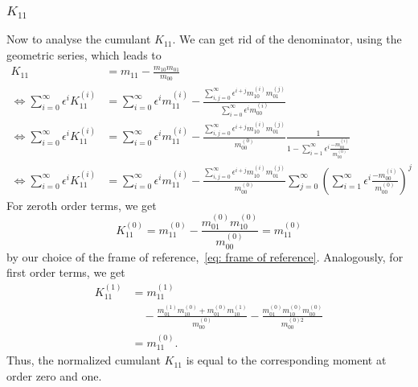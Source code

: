 \subsubsection{\texorpdfstring{$K_{11}$}{K 11}}
\label{subs:K_11}

Now to analyse the cumulant $K_{11}$. We can get rid of the denominator, using the geometric series, which leads to
\begin{equation}
  \begin{aligned}
    K_{11} & = m_{11} - \frac{m_{10}m_{01}}{m_{00}}\\
    \Leftrightarrow
    \sum_{i=0}^\infty \epsilon^i K_{11}^{(i)}
    & = \sum_{i=0}^\infty \epsilon^i m_{11}^{(i)} -
    \frac{\sum_{i,j=0}^\infty \epsilon^{i+j} m_{10}^{(i)}m_{01}^{(j)}}
        {\sum_{i=0}^\infty \epsilon^i m_{00}^{(i)}}\\
    \Leftrightarrow
    \sum_{i=0}^\infty \epsilon^i K_{11}^{(i)}
    & = \sum_{i=0}^\infty \epsilon^i m_{11}^{(i)} -
    \frac{\sum_{i,j=0}^\infty \epsilon^{i+j} m_{10}^{(i)}m_{01}^{(j)}}
        {m_{00}^{(0)}}
        \frac{1}{1 - \sum_{i=1}^\infty \epsilon^i \frac{ - m_{00}^{(i)}}{ m_{00}^{(0)}}}\\
    \Leftrightarrow
    \sum_{i=0}^\infty \epsilon^i K_{11}^{(i)}
    & = \sum_{i=0}^\infty \epsilon^i m_{11}^{(i)} -
    \frac{\sum_{i,j=0}^\infty \epsilon^{i+j} m_{10}^{(i)}m_{01}^{(j)}}
        {m_{00}^{(0)}}
    \sum_{j=0}^\infty {\left(\sum_{i=1}^\infty \epsilon^i \frac{ - m_{00}^{(i)}}{ m_{00}^{(0)}}\right)}^j
  \end{aligned}
\end{equation}
For zeroth order terms, we get
\begin{equation}
  K_{11}^{(0)} = m_{11}^{(0)} - \frac{m_{01}^{(0)}m_{10}^{(0)}}{m_{00}^{(0)}} = m_{11}^{(0)}
\end{equation}
by our choice of the frame of reference,~\eqref{eq: frame of reference}.
Analogously, for first order terms, we get
\begin{equation}
  \begin{aligned}
    K_{11}^{(1)} & = m_{11}^{(1)} \\
    &\quad - \frac{m_{01}^{(1)}m_{10}^{(0)}+m_{01}^{(0)}m_{10}^{(1)}}{m_{00}^{(0)}}
    -\frac{m_{01}^{(0)}m_{10}^{(0)}m_{00}^{(0)}}{m_{00}^{(0)2}}  \\
    &= m_{11}^{(0)}.
  \end{aligned}
\end{equation}
Thus, the normalized cumulant $K_{11}$ is equal to the corresponding moment at order zero and one.

